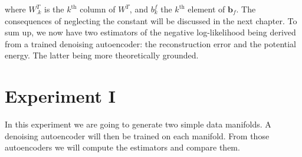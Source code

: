where $W_{.k}^T$ is the $k^{\text{th}}$ column of $W^T$, and $b_k^f$ the $k^{\text{th}}$ element of $\textbf{b}_f$. The consequences of neglecting the constant will be discussed in the next chapter. To sum up, we now have two estimators of the negative log-likelihood being derived from a trained denoising autoencoder: the reconstruction error and the potential energy. The latter being more theoretically grounded.



\section{Experiment I}\label{sec:experiment-I}

In this experiment we are going to generate two simple data manifolds. A denoising autoencoder will then be trained on each manifold. From those autoencoders we will compute the estimators and compare them.

